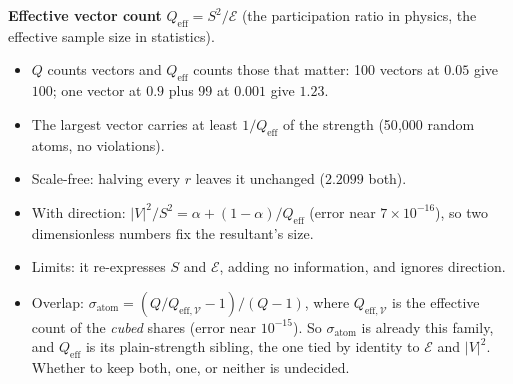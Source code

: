 \documentclass[11pt]{article}
\begin{document}
\textbf{Effective vector count} $Q_{\mathrm{eff}}=S^2/\mathcal E$
(the participation ratio in physics, the effective sample size in
statistics).
\begin{itemize}
\item $Q$ counts vectors and $Q_{\mathrm{eff}}$ counts those that matter:
100 vectors at $0.05$ give $100$; one vector at $0.9$ plus 99 at
$0.001$ give $1.23$.
\item The largest vector carries at least $1/Q_{\mathrm{eff}}$ of the
strength (50{,}000 random atoms, no violations).
\item Scale-free: halving every $r$ leaves it unchanged ($2.2099$ both).
\item With direction: $|V|^2/S^2=\alpha+(1-\alpha)/Q_{\mathrm{eff}}$
(error near $7\times10^{-16}$), so two dimensionless numbers fix the
resultant's size.
\item Limits: it re-expresses $S$ and $\mathcal E$, adding no
information, and ignores direction.
\item Overlap: $\sigma_{\text{atom}}=(Q/Q_{\mathrm{eff},\mathcal V}-1)/(Q-1)$,
where $Q_{\mathrm{eff},\mathcal V}$ is the effective count of the
\emph{cubed} shares (error near $10^{-15}$). So $\sigma_{\text{atom}}$
is already this family, and $Q_{\mathrm{eff}}$ is its plain-strength
sibling, the one tied by identity to $\mathcal E$ and $|V|^2$. Whether
to keep both, one, or neither is undecided.
\end{itemize}
\end{document}
